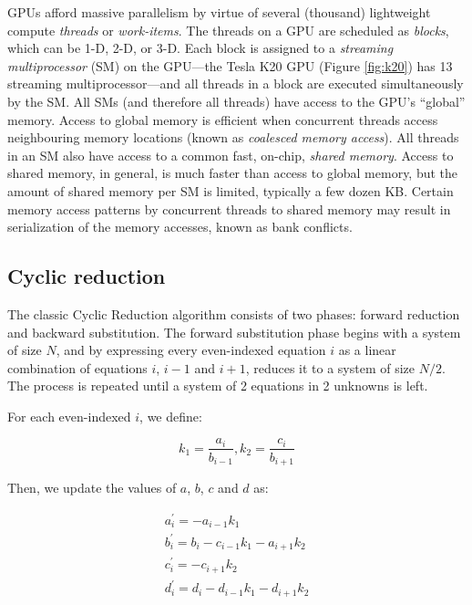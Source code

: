 \documentclass{article}
\begin{document}
        GPUs afford massive parallelism by virtue of several (thousand)
        lightweight compute \emph{threads} or \emph{work-items}.
        The threads on a GPU are scheduled as \emph{blocks},
        which can be 1-D, 2-D, or 3-D.
        Each block is assigned to a \emph{streaming multiprocessor} (SM)
        on the GPU---the Tesla K20 GPU (Figure \ref{fig:k20})
        has 13 streaming multiprocessor---and
        all threads in a block are executed simultaneously by the SM.
        All SMs (and therefore all threads) have access to the GPU's ``global'' memory.
        Access to global memory is efficient when concurrent threads
        access neighbouring memory locations
        (known as \emph{coalesced memory access}).
        All threads in an SM also have access to a common fast, on-chip, \emph{shared memory}.
        Access to shared memory, in general, is much faster than access to global memory,
        but the amount of shared memory per SM is limited, typically a few dozen KB.
        Certain memory access patterns by concurrent threads to shared memory may result in
        serialization of the memory accesses, known as bank conflicts.



    \subsection{Cyclic reduction}

        The classic Cyclic Reduction algorithm consists of two phases:
        forward reduction and backward substitution.
        The forward substitution phase begins with a system of size $N$,
        and by expressing every even-indexed equation $i$ as a linear
        combination of equations $i$, $i-1$ and $i+1$, reduces it to a
        system of size $N/2$.
        The process is repeated until a system of 2 equations in 2 unknowns
        is left.

        For each even-indexed $i$, we define:

        \begin{equation*}
        k_1 = \frac{a_i}{b_{i-1}},
        k_2 = \frac{c_i}{b_{i+1}}
        \end{equation*}

        Then, we update the values of $a$, $b$, $c$ and $d$ as:

        \begin{align} \label{eqn:forward-reduction}
        & a^{\prime}_i = -a_{i-1}k_1 & \\
        & b^{\prime}_i = b_i - c_{i-1}k_1 - a_{i+1}k_2 & \\
        & c^{\prime}_i = -c_{i+1}k_2 & \\
        & d^{\prime}_i = d_i - d_{i-1}k_1  - d_{i+1}k_2 &
        \end{align}
\end{document}
